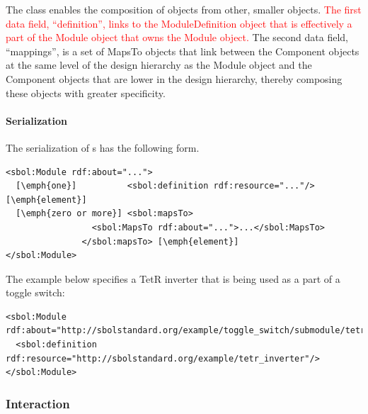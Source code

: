 The  class enables the composition of  objects from other, smaller  objects. \textcolor{red}{The first data field, ``definition'', links to the ModuleDefinition object that is effectively a part of the Module object that owns the Module object.} The second data field, ``mappings'', is a set of MapsTo objects that link between the Component objects at the same level of the design hierarchy as the Module object and the Component objects that are lower in the design hierarchy, thereby composing these objects with greater specificity.


\paragraph{Serialization}
The serialization of s has the following form.
\begin{lstlisting}
<sbol:Module rdf:about="...">
  [\emph{one}]          <sbol:definition rdf:resource="..."/> [\emph{element}]
  [\emph{zero or more}] <sbol:mapsTo>
                 <sbol:MapsTo rdf:about="...">...</sbol:MapsTo>
               </sbol:mapsTo> [\emph{element}]
</sbol:Module>
\end{lstlisting}

The example below specifies a TetR inverter that is being used as
a part of a toggle switch:

\begin{lstlisting}
<sbol:Module rdf:about="http://sbolstandard.org/example/toggle_switch/submodule/tetr_inverter">
  <sbol:definition rdf:resource="http://sbolstandard.org/example/tetr_inverter"/>
</sbol:Module>
\end{lstlisting}


\subsubsection{Interaction}
\label{sec:Interaction}

